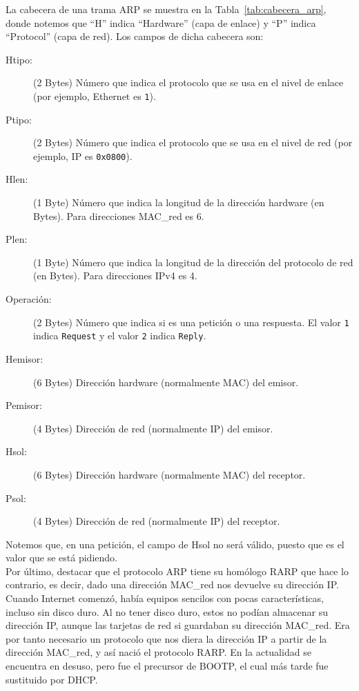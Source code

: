La cabecera de una trama \acrshort{ARP} se muestra en la Tabla~\ref{tab:cabecera_arp}, donde notemos que ``H'' indica ``Hardware'' (capa de enlace) y ``P'' indica ``Protocol'' (capa de red). Los campos de dicha cabecera son:
\begin{description}
    \item[Htipo:] (2 Bytes) Número que indica el protocolo que se usa en el nivel de enlace (por ejemplo, Ethernet es \verb|1|).
    \item[Ptipo:] (2 Bytes) Número que indica el protocolo que se usa en el nivel de red (por ejemplo, \acrshort{IP} es \verb|0x0800|).
    \item[Hlen:] (1 Byte) Número que indica la longitud de la dirección hardware (en Bytes). Para direcciones \acrshort{MAC_red} es 6.
    \item[Plen:] (1 Byte) Número que indica la longitud de la dirección del protocolo de red (en Bytes). Para direcciones \acrshort{IPv4} es 4.
    \item[Operación:] (2 Bytes) Número que indica si es una petición o una respuesta. El valor \verb|1| indica \verb|Request| y el valor \verb|2| indica \verb|Reply|.
    \item[Hemisor:] (6 Bytes) Dirección hardware (normalmente MAC) del emisor.
    \item[Pemisor:] (4 Bytes) Dirección de red (normalmente IP) del emisor.
    \item[Hsol:] (6 Bytes) Dirección hardware (normalmente MAC) del receptor.
    \item[Psol:] (4 Bytes) Dirección de red (normalmente IP) del receptor.
\end{description}

Notemos que, en una petición, el campo de Hsol no será válido, puesto que es el valor que se está pidiendo.\\

Por último, destacar que el protocolo \acrshort{ARP} tiene su homólogo \acrfull{RARP} que hace lo contrario, es decir, dado una dirección \acrshort{MAC_red} nos devuelve su dirección IP\@. Cuando Internet comenzó, había equipos sencilos con pocas características, incluso sin disco duro. Al no tener disco duro, estos no podían almacenar su dirección IP, aunque las tarjetas de red si guardaban su dirección \acrshort{MAC_red}. Era por tanto necesario un protocolo que nos diera la dirección IP a partir de la dirección \acrshort{MAC_red}, y así nació el protocolo \acrshort{RARP}. En la actualidad se encuentra en desuso, pero fue el precursor de \acrshort{BOOTP}, el cual más tarde fue sustituido por \acrshort{DHCP}.

